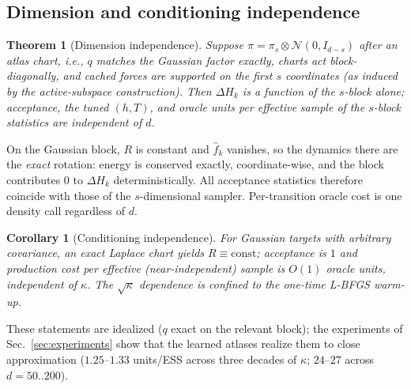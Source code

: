\documentclass[10pt,journal,compsoc]{IEEEtran}
\newtheorem{theorem}{Theorem}
\newtheorem{corollary}{Corollary}
\begin{document}
\subsection{Dimension and conditioning independence}
\begin{theorem}[Dimension independence]\label{thm:dimfree}
Suppose $\pi=\pi_s\otimes\mathcal N(0,I_{d-s})$ after an atlas chart, i.e.,
$q$ matches the Gaussian factor exactly, charts act block-diagonally, and
cached forces are supported on the first $s$ coordinates (as induced by the
active-subspace construction). Then $\Delta H_k$ is a function of the
$s$-block alone; acceptance, the tuned $(h,T)$, and oracle units per
effective sample of the $s$-block statistics are independent of $d$.
\end{theorem}
\begin{IEEEproof}
On the Gaussian block, $R$ is constant and $\hat f_k$ vanishes, so the
dynamics there are the \emph{exact} rotation: energy is conserved exactly,
coordinate-wise, and the block contributes $0$ to $\Delta H_k$
deterministically. All acceptance statistics therefore coincide with those
of the $s$-dimensional sampler. Per-transition oracle cost is one density
call regardless of $d$.
\end{IEEEproof}

\begin{corollary}[Conditioning independence]\label{cor:kappa}
For Gaussian targets with arbitrary covariance, an exact Laplace chart
yields $R\equiv\mathrm{const}$; acceptance is $1$ and production cost per
effective (near-independent) sample is $O(1)$ oracle units, independent of
$\kappa$. The $\sqrt\kappa$ dependence is confined to the one-time L-BFGS
warm-up.
\end{corollary}

These statements are idealized ($q$ exact on the relevant block); the
experiments of Sec.~\ref{sec:experiments} show that the learned atlases
realize them to close approximation ($1.25$--$1.33$ units/ESS across three
decades of $\kappa$; $24$--$27$ across $d=50..200$).
\end{document}
